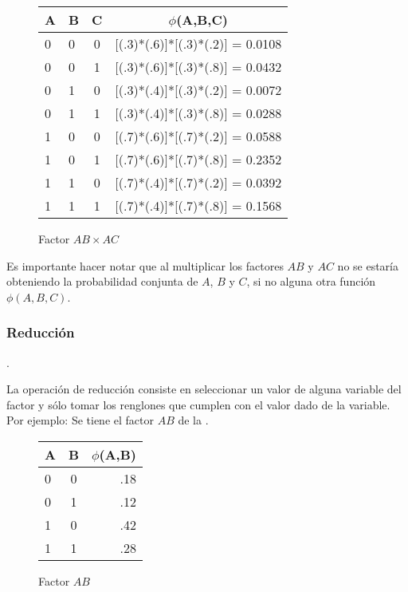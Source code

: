 \begin{figure}[H]
  \begin{center}
    \begin{tabular}{ l  l  c | c }
      A & B & C & $\phi$(A,B,C)\\ \hline
      0 & 0 & 0 & [(.3)*(.6)]*[(.3)*(.2)] = 0.0108  \\ \hline
      0 & 0 & 1 & [(.3)*(.6)]*[(.3)*(.8)] = 0.0432 \\ \hline
      0 & 1 & 0 & [(.3)*(.4)]*[(.3)*(.2)] = 0.0072 \\ \hline
      0 & 1 & 1 & [(.3)*(.4)]*[(.3)*(.8)] = 0.0288 \\ \hline
      1 & 0 & 0 & [(.7)*(.6)]*[(.7)*(.2)] = 0.0588 \\ \hline
      1 & 0 & 1 & [(.7)*(.6)]*[(.7)*(.8)] = 0.2352 \\ \hline
      1 & 1 & 0 & [(.7)*(.4)]*[(.7)*(.2)] = 0.0392 \\ \hline
      1 & 1 & 1 & [(.7)*(.4)]*[(.7)*(.8)] = 0.1568 \\ 
    \end{tabular}
  \end{center}
  \caption{Factor $AB \times AC$}
  \label{fig:FactorABC}
\end{figure}

Es importante hacer notar que al multiplicar los factores $AB$ y $AC$ no se estaría obteniendo la probabilidad conjunta de $A$, $B$ y $C$, si no alguna otra función $\phi(A,B,C)$.

\subsubsection{Reducción}

\begin{definition}[Reducción]

\parencite[111]{KollerFriedman2009}.
\end{definition}

La operación de reducción consiste en seleccionar un valor de alguna variable del factor y sólo tomar los renglones que cumplen con el valor dado de la variable. Por ejemplo: Se tiene el factor $AB$ de la .

\begin{figure}[H]
  \begin{center}
    \begin{tabular}{ l  c | r }
      A & B & $\phi$(A,B)\\ \hline
      0 & 0 & .18  \\ \hline
      0 & 1 & .12  \\ \hline
      1 & 0 & .42  \\ \hline
      1 & 1 & .28  \\
    \end{tabular}
  \end{center}
  \caption{Factor $AB$}
  \label{fig:FactorAB}
\end{figure}

